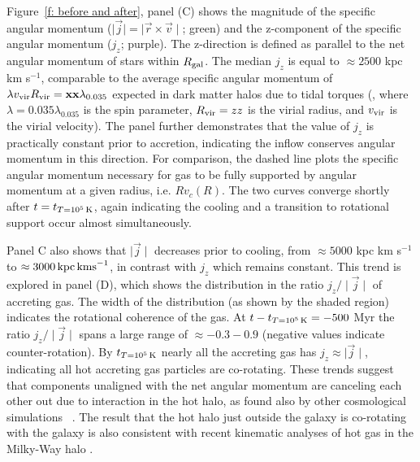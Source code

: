 \documentclass[fleqn,usenatbib]{mnras}
\newcommand{\tcon}{t_{T=10^5\,{\rm K}}}
\newcommand{\Rvir}{R_{\rm vir}}
\newcommand{\vvir}{v_{\rm vir}}
\begin{document}
Figure~\ref{f: before and after}, panel (C) shows the magnitude of the specific angular momentum ($\mid \vec j \mid = \mid \vec r \times \vec v \mid$; green) and the z-component of the specific angular momentum ($j_z$; purple).
The z-direction is defined as parallel to the net angular momentum of stars within $R_{\rm gal}$.
The median $j_z$ is equal to $\approx 2500$ kpc km s$^{-1}$, comparable to the average specific angular momentum of $\lambda \vvir \Rvir=\mathbf{xx}\lambda_{0.035}$ expected in dark matter halos due to tidal torques (\cite{Rodriguez2016}, where $\lambda = 0.035 \lambda_{0.035}$ is the spin parameter,  $\Rvir=zz$ is the virial radius, and $\vvir$ is the virial velocity).
The panel further demonstrates that the value of $j_z$ is practically constant prior to accretion, indicating the inflow conserves angular momentum in this direction.
For comparison, the dashed line plots the specific angular momentum necessary for gas to be fully supported by angular momentum at a given radius, i.e. $Rv_c(R)$.
The two curves converge shortly after $t=\tcon$, again indicating the cooling and a transition to rotational support occur almost simultaneously. 

Panel C also shows that $\mid \vec j \mid$ decreases prior to cooling, from $\approx 5000$ kpc km s$^{-1}$ to $\approx 3000\,{\rm kpc\,km s}^{-1}$, in contrast with  $j_z$ which remains constant.
This trend is explored in  panel (D), which shows the distribution in the ratio $j_z/\mid\vec j\mid$ of accreting gas.
The width of the distribution (as shown by the shaded region) indicates the rotational coherence of the gas. 
At $t-\tcon=-500$ Myr the ratio $j_z/\mid\vec j\mid$ spans a large range of $\approx -0.3 - 0.9$ (negative values indicate counter-rotation).
By $\tcon$ nearly all the accreting gas has $j_z\approx\mid\vec j\mid$, indicating all hot accreting gas particles are co-rotating. 
These trends suggest that components unaligned with the net angular momentum are canceling each other out due to interaction in the hot halo, as found also by other cosmological simulations ~\citep[e.g.][]{DeFelippis2017}.
The result that the hot halo just outside the galaxy is co-rotating with the galaxy is also consistent with recent kinematic analyses of hot gas in the Milky-Way halo \citep{Miller2016}. 
\end{document}
